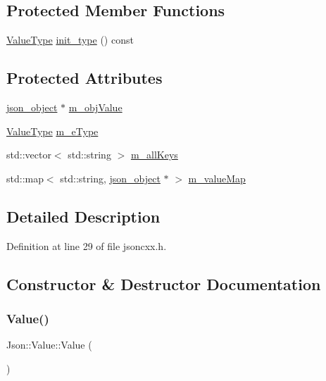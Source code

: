\subsection*{Protected Member Functions}
\begin{DoxyCompactItemize}
\item 
\hyperlink{namespace_json_a7d654b75c16a57007925868e38212b4e}{Value\+Type} \hyperlink{class_json_1_1_value_ad24bf765750e8ea535d28bcf981d551a}{init\+\_\+type} () const
\end{DoxyCompactItemize}
\subsection*{Protected Attributes}
\begin{DoxyCompactItemize}
\item 
\hyperlink{structjson__object}{json\+\_\+object} $\ast$ \hyperlink{class_json_1_1_value_a3a705e06c2dbc4a6e142b58b0cbca57e}{m\+\_\+obj\+Value}
\item 
\hyperlink{namespace_json_a7d654b75c16a57007925868e38212b4e}{Value\+Type} \hyperlink{class_json_1_1_value_ae6116e08a5c1833f858c1d29156365b1}{m\+\_\+e\+Type}
\item 
std\+::vector$<$ std\+::string $>$ \hyperlink{class_json_1_1_value_a914e4896d12ffa87726125d2f60ea9c0}{m\+\_\+all\+Keys}
\item 
std\+::map$<$ std\+::string, \hyperlink{structjson__object}{json\+\_\+object} $\ast$ $>$ \hyperlink{class_json_1_1_value_a2b9203575d8ff75f02d30e09befb1204}{m\+\_\+value\+Map}
\end{DoxyCompactItemize}


\subsection{Detailed Description}


Definition at line 29 of file jsoncxx.\+h.



\subsection{Constructor \& Destructor Documentation}
\mbox{\label{class_json_1_1_value_a3dd8ad60321f45f8d51c864e3a96a848}} 
\subsubsection{\texorpdfstring{Value()}{Value()}\hspace{0.1cm}{\footnotesize\ttfamily [1/2]}}
{\footnotesize\ttfamily Json\+::\+Value\+::\+Value (\begin{DoxyParamCaption}{ }\end{DoxyParamCaption})}



